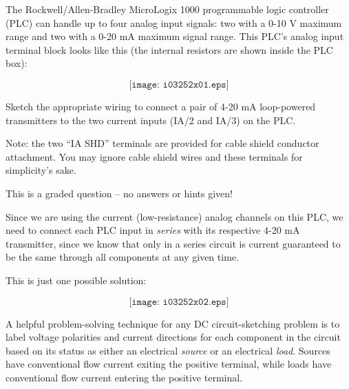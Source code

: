 

The Rockwell/Allen-Bradley MicroLogix 1000 programmable logic controller (PLC) can handle up to four analog input signals: two with a 0-10 V maximum range and two with a 0-20 mA maximum signal range.  This PLC's analog input terminal block looks like this (the internal resistors are shown inside the PLC box):

$$\texttt{[image: i03252x01.eps]}$$

Sketch the appropriate wiring to connect a pair of 4-20 mA loop-powered transmitters to the two current inputs (IA/2 and IA/3) on the PLC.

\vfil 

Note: the two ``IA SHD'' terminals are provided for cable shield conductor attachment.  You may ignore cable shield wires and these terminals for simplicity's sake.

\eject






This is a graded question -- no answers or hints given!
 






Since we are using the current (low-resistance) analog channels on this PLC, we need to connect each PLC input in {\it series} with its respective 4-20 mA transmitter, since we know that only in a series circuit is current guaranteed to be the same through all components at any given time.

\vskip 10pt

This is just one possible solution:

$$\texttt{[image: i03252x02.eps]}$$

A helpful problem-solving technique for any DC circuit-sketching problem is to label voltage polarities and current directions for each component in the circuit based on its status as either an electrical {\it source} or an electrical {\it load}.  Sources have conventional flow current exiting the positive terminal, while loads have conventional flow current entering the positive terminal.




